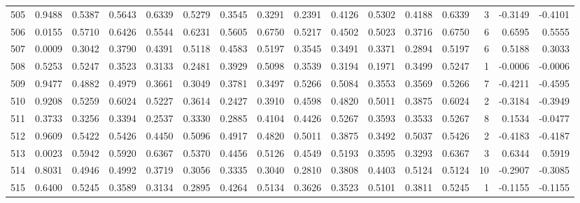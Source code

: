 \begin{tabular}{lrrrrrrrrrrrrrrr}
505 &      0.9488 &  0.5387 &  0.5643 &  0.6339 &  0.5279 &  0.3545 &  0.3291 &  0.2391 &  0.4126 &  0.5302 &   0.4188 &     0.6339 &      3 &                   -0.3149 &                    -0.4101 \\
506 &      0.0155 &  0.5710 &  0.6426 &  0.5544 &  0.6231 &  0.5605 &  0.6750 &  0.5217 &  0.4502 &  0.5023 &   0.3716 &     0.6750 &      6 &                    0.6595 &                     0.5555 \\
507 &      0.0009 &  0.3042 &  0.3790 &  0.4391 &  0.5118 &  0.4583 &  0.5197 &  0.3545 &  0.3491 &  0.3371 &   0.2894 &     0.5197 &      6 &                    0.5188 &                     0.3033 \\
508 &      0.5253 &  0.5247 &  0.3523 &  0.3133 &  0.2481 &  0.3929 &  0.5098 &  0.3539 &  0.3194 &  0.1971 &   0.3499 &     0.5247 &      1 &                   -0.0006 &                    -0.0006 \\
509 &      0.9477 &  0.4882 &  0.4979 &  0.3661 &  0.3049 &  0.3781 &  0.3497 &  0.5266 &  0.5084 &  0.3553 &   0.3569 &     0.5266 &      7 &                   -0.4211 &                    -0.4595 \\
510 &      0.9208 &  0.5259 &  0.6024 &  0.5227 &  0.3614 &  0.2427 &  0.3910 &  0.4598 &  0.4820 &  0.5011 &   0.3875 &     0.6024 &      2 &                   -0.3184 &                    -0.3949 \\
511 &      0.3733 &  0.3256 &  0.3394 &  0.2537 &  0.3330 &  0.2885 &  0.4104 &  0.4426 &  0.5267 &  0.3593 &   0.3533 &     0.5267 &      8 &                    0.1534 &                    -0.0477 \\
512 &      0.9609 &  0.5422 &  0.5426 &  0.4450 &  0.5096 &  0.4917 &  0.4820 &  0.5011 &  0.3875 &  0.3492 &   0.5037 &     0.5426 &      2 &                   -0.4183 &                    -0.4187 \\
513 &      0.0023 &  0.5942 &  0.5920 &  0.6367 &  0.5370 &  0.4456 &  0.5126 &  0.4549 &  0.5193 &  0.3595 &   0.3293 &     0.6367 &      3 &                    0.6344 &                     0.5919 \\
514 &      0.8031 &  0.4946 &  0.4992 &  0.3719 &  0.3056 &  0.3335 &  0.3040 &  0.2810 &  0.3808 &  0.4403 &   0.5124 &     0.5124 &     10 &                   -0.2907 &                    -0.3085 \\
515 &      0.6400 &  0.5245 &  0.3589 &  0.3134 &  0.2895 &  0.4264 &  0.5134 &  0.3626 &  0.3523 &  0.5101 &   0.3811 &     0.5245 &      1 &                   -0.1155 &                    -0.1155 \\

\end{tabular}
